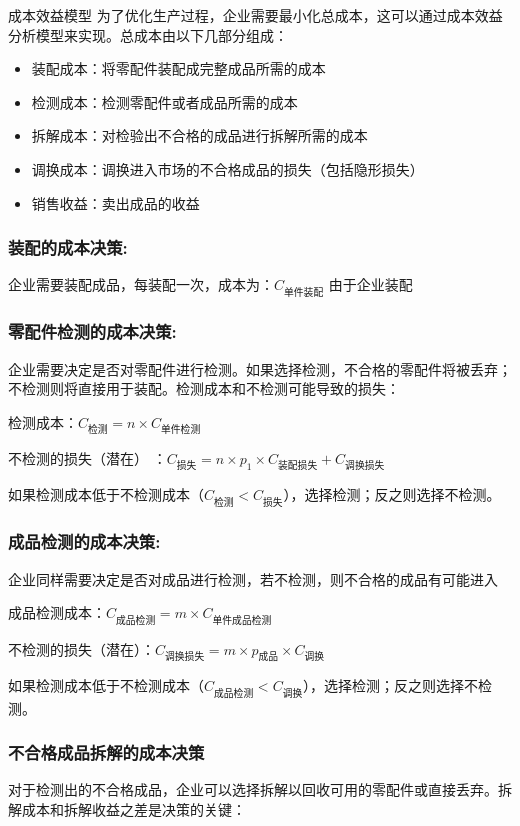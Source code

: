 \documentclass[withoutpreface,bwprint]{cumcmthesis}
\begin{document}
成本效益模型
为了优化生产过程，企业需要最小化总成本，这可以通过成本效益分析模型来实现。总成本由以下几部分组成：
\begin{itemize}
    \item 装配成本：将零配件装配成完整成品所需的成本
    \item 检测成本：检测零配件或者成品所需的成本
    \item 拆解成本：对检验出不合格的成品进行拆解所需的成本
    \item 调换成本：调换进入市场的不合格成品的损失（包括隐形损失）
    \item 销售收益：卖出成品的收益
\end{itemize}

\subsubsection{装配的成本决策:}
企业需要装配成品，每装配一次，成本为：$C_{\text{单件装配}}$
由于企业装配

\subsubsection{零配件检测的成本决策:}
企业需要决定是否对零配件进行检测。如果选择检测，不合格的零配件将被丢弃；不检测则将直接用于装配。检测成本和不检测可能导致的损失：

检测成本：$C_{\text{检测}} = n \times C_{\text{单件检测}}$

不检测的损失（潜在） ：$C_{\text{损失}} = n \times p_1 \times C_{\text{装配损失}} + C_{\text{调换损失}}$

如果检测成本低于不检测成本（$C_{\text{检测}}<C_{\text{损失}}$），选择检测；反之则选择不检测。

\subsubsection{成品检测的成本决策:}
企业同样需要决定是否对成品进行检测，若不检测，则不合格的成品有可能进入

成品检测成本：$C_{\text{成品检测}} = m \times C_{\text{单件成品检测}}$

不检测的损失（潜在）：$C_{\text{调换损失}} = m \times p_{\text{成品}} \times C_{\text{调换}}$

如果检测成本低于不检测成本（$C_{\text{成品检测}}<C_{\text{调换}}$），选择检测；反之则选择不检测。

\subsubsection{不合格成品拆解的成本决策}
对于检测出的不合格成品，企业可以选择拆解以回收可用的零配件或直接丢弃。拆解成本和拆解收益之差是决策的关键：
\end{document}
